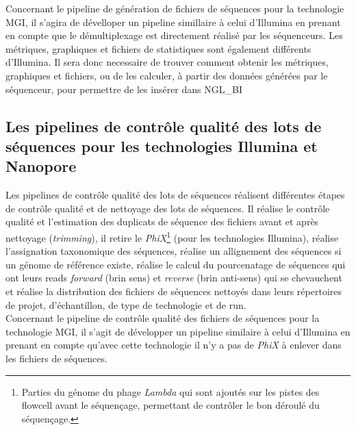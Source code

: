 Concernant le pipeline de génération de fichiers de séquences pour la technologie MGI, il s'agira de dévelloper un pipeline simillaire à celui d'Illumina en prenant en compte que le démultiplexage est directement réalisé par les séquenceurs. Les métriques, graphiques et fichiers de statistiques sont également différents d'Illumina. Il sera donc necessaire de trouver comment obtenir les métriques, graphiques et fichiers, ou de les calculer, à partir des données générées par le séquenceur, pour permettre de les insérer dans NGL\_BI

\subsection{Les pipelines de contrôle qualité des lots de séquences pour les technologies Illumina et Nanopore}
Les pipelines de contrôle qualité des lots de séquences réalisent différentes étapes de contrôle qualité et de nettoyage des lots de séquences. Il réalise le contrôle qualité et l'estimation des duplicats de séquence des fichiers avant et après nettoyage (\emph{trimming}), il retire le \emph{PhiX}\footnote{Parties du génome du phage \emph{Lambda} qui sont ajoutés sur les pistes des flowcell avant le séquençage, permettant de contrôler le bon déroulé du séquençage.} (pour les technologies Illumina), réalise l'assignation taxonomique des séquences, réalise un allignement des séquences si un génome de référence existe, réalise le calcul du pourcenatage de séquences qui ont leurs reads \emph{forward} (brin sens) et \emph{reverse} (brin anti-sens) qui se chevauchent et réalise la distribution des fichiers de séquences nettoyés dans leurs répertoires de projet, d'échantillon, de type de technologie et de run.\\

Concernant le pipeline de contrôle qualité des fichiers de séquences pour la technologie MGI, il s'agit de développer un pipeline similaire à celui d'Illumina en prenant en compte qu'avec cette technologie il n'y a pas de \emph{PhiX} à enlever dans les fichiers de séquences.
